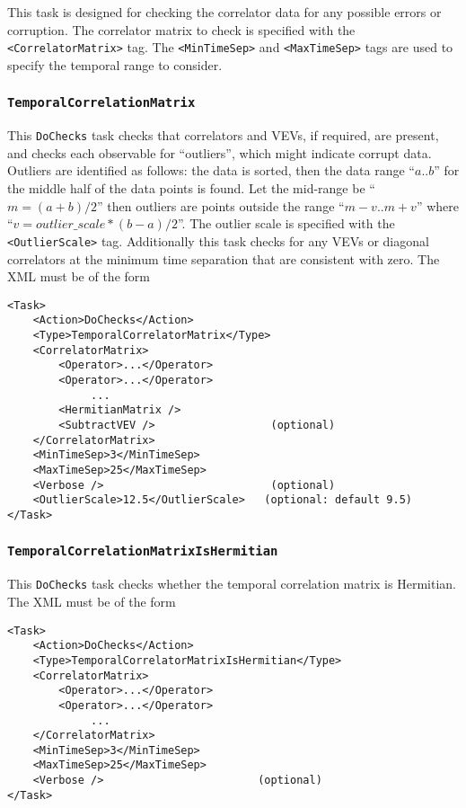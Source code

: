 \documentclass[12pt]{article}
\newcommand{\vb}{\texttt}
\begin{document}
This task is designed for checking the correlator data for any possible errors
or corruption.
The correlator matrix to check is specified with the \vb{<CorrelatorMatrix>} tag.
The \vb{<MinTimeSep>} and \vb{<MaxTimeSep>} tags are used to specify the temporal
range to consider.

\subsubsection{\vb{TemporalCorrelationMatrix}}
This \vb{DoChecks} task checks that correlators and VEVs, if required, are present,
and checks each observable for ``outliers'', which might indicate corrupt data.
Outliers are identified as follows: the data is sorted, then the data range ``$a..b$''
for the middle half of the data points is found.
Let the mid-range be ``$m=(a+b)/2$'' then outliers are points outside the range
``$m-v .. m+v$''  where ``$v = outlier\_scale * (b-a)/2$''.
The outlier scale is specified with the \vb{<OutlierScale>} tag.
Additionally this task checks for any VEVs or diagonal correlators
at the minimum time separation that are consistent with zero.
The XML must be of the form
\begin{verbatim}
<Task>
    <Action>DoChecks</Action>
    <Type>TemporalCorrelatorMatrix</Type>
    <CorrelatorMatrix>
        <Operator>...</Operator>
        <Operator>...</Operator>
             ...
        <HermitianMatrix />
        <SubtractVEV />                  (optional)
    </CorrelatorMatrix>
    <MinTimeSep>3</MinTimeSep>
    <MaxTimeSep>25</MaxTimeSep>
    <Verbose />                          (optional)
    <OutlierScale>12.5</OutlierScale>   (optional: default 9.5)
</Task>
\end{verbatim}

\subsubsection{\vb{TemporalCorrelationMatrixIsHermitian}}
This \vb{DoChecks} task checks whether the temporal correlation matrix is Hermitian.
The XML must be of the form
\begin{verbatim}
<Task>
    <Action>DoChecks</Action>
    <Type>TemporalCorrelatorMatrixIsHermitian</Type>
    <CorrelatorMatrix>
        <Operator>...</Operator>
        <Operator>...</Operator>
             ...
    </CorrelatorMatrix>
    <MinTimeSep>3</MinTimeSep>
    <MaxTimeSep>25</MaxTimeSep>
    <Verbose />                        (optional)
</Task>
\end{verbatim}
\end{document}
